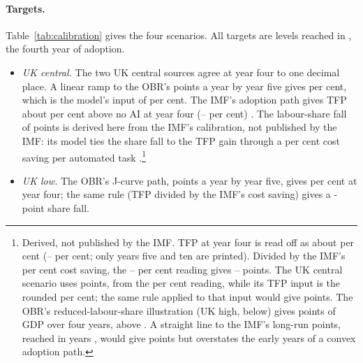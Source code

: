\paragraph{Targets.} Table~\ref{tab:calibration} gives the four scenarios. All targets are levels reached in \genHeadYear{}, the fourth year of adoption.
\begin{itemize}
\item \emph{UK central.} The two UK central sources agree at year four to one decimal place. A linear ramp to the OBR's \genUkCentralObrBoostPp{} points a year by year five gives \genUkCentralTfpInputTwoDp{} per cent, which is the model's input of \genUkCentralTfpPct{} per cent. The IMF's adoption path gives TFP about \genImfTfpYFourPct{} per cent above no AI at year four (\genImfTfpYFourLoPct--\genImfTfpYFourHiPct{} per cent) \citep[Table~1 and Figure~9]{imf2026sip}. The labour-share fall of \genUkCentralFallPp{} points is derived here from the IMF's calibration, not published by the IMF: its model ties the share fall to the TFP gain through a \genImfCostSavingPct{} per cent cost saving per automated task \citep[para~44]{imf2026sip}.\footnote{Derived, not published by the IMF. TFP at year four is read off \citet[Figure~9]{imf2026sip} as about \genImfTfpYFourPct{} per cent (\genImfTfpYFourLoPct--\genImfTfpYFourHiPct{} per cent; only years five and ten are printed). Divided by the IMF's \genImfCostSavingPct{} per cent cost saving, the \genImfTfpYFourLoPct--\genImfTfpYFourHiPct{} per cent reading gives \genImfShareReadLoPp--\genImfShareReadHiPp{} points. The UK central scenario uses \genUkCentralFallPp{} points, from the \genImfTfpYFourPct{} per cent reading, while its TFP input is the rounded \genUkCentralTfpPct{} per cent; the same rule applied to that input would give \genUkCentralShareInputConsistentPp{} points. The OBR's reduced-labour-share illustration (UK high, below) gives \genObrWageShareFourYearPp{} points of GDP over four years, above \genUkCentralFallPp{}. A straight line to the IMF's long-run \genImfLongRunSharePp{} points, reached in \genImfLongRunYears{} years \citep[para~44]{imf2026sip}, would give \genImfLinearShareYFourPp{} points but overstates the early years of a convex adoption path.}
\item \emph{UK low.} The OBR's J-curve path, \genUkLowObrBoostPp{} points a year by year five, gives \genUkLowTfpPct{} per cent at year four; the same rule (TFP divided by the IMF's cost saving) gives a \genUkLowShareFromTfpPp{}-point share fall.

\end{itemize}
